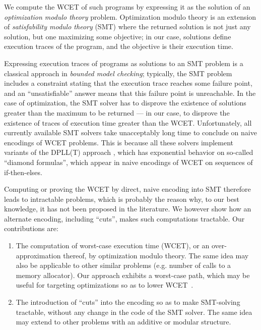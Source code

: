 \documentclass[a4paper,twocolumn,11pt]{article}
\begin{document}
We compute the WCET of such programs by expressing it as the solution of an \emph{optimization modulo theory} problem. Optimization modulo theory is an extension of \emph{satisfability modulo theory} (SMT) where the returned solution is not just any solution, but one maximizing some objective; in our case, solutions define execution traces of the program, and the objective is their execution time.

Expressing execution traces of programs as solutions to an SMT problem is a classical approach in \emph{bounded model checking}; typically, the SMT problem includes a constraint stating that the execution trace reaches some failure point, and an ``unsatisfiable'' answer means that this failure point is unreachable.
In the case of optimization, the SMT solver has to disprove the existence of solutions greater than the maximum to be returned --- in our case, to disprove the existence of traces of execution time greater than the WCET.
Unfortunately, all currently available SMT solvers take unacceptably long time to conclude on naive encodings of WCET problems.
This is because all these solvers implement variants of the DPLL(T) approach \parencite{Kroening_Strichman}, which has exponential behavior on so-called ``diamond formulas'', which appear in naive encodings of WCET on sequences of if-then-elses.

Computing or proving the WCET by direct, naive encoding into SMT therefore leads to intractable problems, which is probably the reason why, to our best knowledge, it has not been proposed in the literature.
We however show how an alternate encoding, including ``cuts'', makes such computations tractable.
Our contributions are:

\begin{enumerate}
\item The computation of worst-case execution time (WCET), or an over-approximation thereof, by optimization modulo theory. The same idea may also be applicable to other similar problems (e.g. number of calls to a memory allocator).
Our approach exhibits a worst-case path, which may be useful for targeting optimizations so as to lower WCET~\parencite{DBLP:journals/rts/ZhaoKWHM06}.
\item The introduction of ``cuts'' into the encoding so as to make SMT-solving tractable, without any change in the code of the SMT solver. The same idea may extend to other problems with an additive or modular structure.
\end{enumerate}
\end{document}
